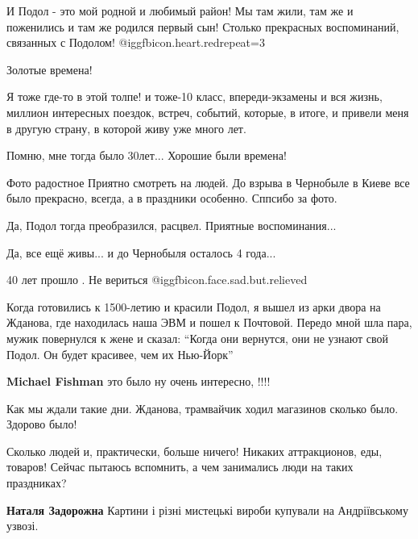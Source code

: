 \begin{itemize}
\begin{itemize} %

И Подол - это мой родной и любимый район! Мы там жили, там же и поженились и
там же родился первый сын! Столько прекрасных воспоминаний, связанных с
Подолом! @igg{fbicon.heart.red}{repeat=3}

\end{itemize} %

Золотые времена!


Я тоже где-то в этой толпе! и тоже-10 класс, впереди-экзамены и вся жизнь,
миллион интересных поездок, встреч, событий, которые, в итоге, и привели меня в
другую страну, в которой живу уже много лет.


Помню, мне тогда было 30лет... Хорошие были времена!


Фото радостное Приятно смотреть на людей. До взрыва в Чернобыле в Киеве все было
прекрасно, всегда, а в праздники особенно. Сппсибо за фото.


Да, Подол тогда преобразился, расцвел. Приятные воспоминания...

Да, все ещё живы... и до Чернобыля осталось 4 года...

40 лет прошло .
Не вериться  @igg{fbicon.face.sad.but.relieved} 


Когда готовились к 1500-летию и красили Подол, я вышел из арки двора на
Жданова, где находилась наша ЭВМ и пошел к Почтовой. Передо мной шла пара,
мужик повернулся к жене и сказал: \enquote{Когда они вернутся, они не узнают свой
Подол. Он будет красивее, чем их Нью-Йорк}

\textbf{Michael Fishman} это было ну очень интересно, !!!!

Как мы ждали такие дни. Жданова, трамвайчик ходил магазинов сколько было. Здорово было!


Сколько людей и, практически, больше ничего! Никаких аттракционов, еды,
товаров! Сейчас пытаюсь вспомнить, а чем занимались люди на таких праздниках?

\begin{itemize} %
\textbf{Наталя Задорожна} Картини і різні мистецькі вироби купували на Андріївському узвозі.


\end{itemize}
\end{itemize}
